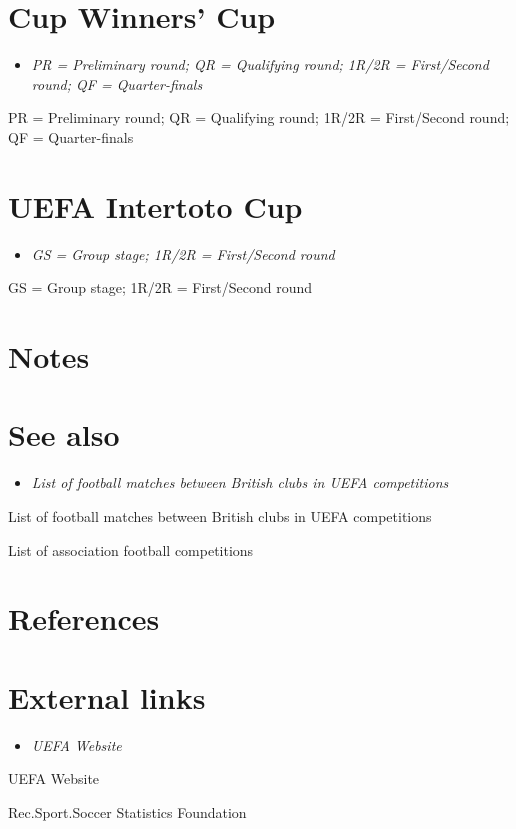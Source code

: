 \section{Cup Winners' Cup}\label{cup-winners-cup}

\begin{itemize}
\item
  \emph{PR = Preliminary round; QR = Qualifying round; 1R/2R =
  First/Second round; QF = Quarter-finals}
\end{itemize}

PR = Preliminary round; QR = Qualifying round; 1R/2R = First/Second
round; QF = Quarter-finals

\section{UEFA Intertoto Cup}\label{uefa-intertoto-cup}

\begin{itemize}
\item
  \emph{GS = Group stage; 1R/2R = First/Second round}
\end{itemize}

GS = Group stage; 1R/2R = First/Second round

\section{Notes}\label{notes}

\section{See also}\label{see-also}

\begin{itemize}
\item
  \emph{List of football matches between British clubs in UEFA
  competitions}
\end{itemize}

List of football matches between British clubs in UEFA competitions

List of association football competitions

\section{References}\label{references}

\section{External links}\label{external-links}

\begin{itemize}
\item
  \emph{UEFA Website}
\end{itemize}

UEFA Website

Rec.Sport.Soccer Statistics Foundation
